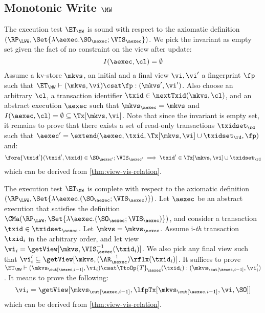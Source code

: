\subsection{Monotonic Write \( \MW \)}
\label{sec:sound-complete-mw}

The execution test $\ET_\MW$ is sound with respect to the axiomatic definition 
$(\RP_{\LWW}, \Set{\lambda \aexec. \SO_{\aexec} ; \VIS_{\aexec} })$.
We pick the invariant as empty set given the fact of no constraint on the view after update:
\[ 
    I( \aexec, \cl ) = \emptyset 
\]
Assume a kv-store $\mkvs$, an initial and a final view $\vi, \vi'$  a fingerprint $\fp$ 
such that $\ET_{\MW} \vdash (\mkvs, \vi) \csat \fp: (\mkvs',\vi')$. 
Also choose an arbitrary $\cl$, a transaction identifier $\txid \in \nextTxid(\mkvs, \cl)$, 
and an abstract execution $\aexec$ such that $\mkvs_{\aexec} = \mkvs$ and 
\( I(\aexec, \cl) =  \emptyset \subseteq \Tx[\mkvs, \vi] \).
Note that since the invariant  is empty set, it remains to prove that there exists a set of read-only transactions \( \txidset_\rd \) such that
\( \aexec' = \extend(\aexec, \txid, \Tx[\mkvs, \vi] \cup \txidset_\rd, \fp ) \) and:
\[
    \begin{array}{@{}l@{}}
        \fora{ \txid' }  (\txid' ,\txid)  \in \SO_{\aexec'} ; \VIS_{\aexec'}
        \implies \txid' \in \Tx[\mkvs, \vi] \cup \txidset_\rd
    \end{array}
\]
which can be derived from \cref{thm:view-vis-relation}.

The execution test $\ET_{\MW}$ is complete with respect to 
the axiomatic definition $(\RP_{\LWW}, \Set{\lambda \aexec.(\SO_{\aexec} ; \VIS_{\aexec})})$. 
Let $\aexec$ be an abstract execution that satisfies the definition
$\CMa(\RP_{\LWW}, \Set{\lambda \aexec.(\SO_{\aexec} ; \VIS_{\aexec})})$, 
and consider a transaction $\txid \in \txidset_{\aexec}$. 
Let \( \mkvs = \mkvs_\aexec \).
Assume i-\emph{th} transaction \( \txid_i \) in the arbitrary order,
and let view \( \vi_{i} = \getView[\mkvs, \VIS^{-1}_{\aexec}(\txid_{i})] \).
We also pick any final view such that \( \vi'_{i} \subseteq \getView[\mkvs, (\AR^{-1}_{\aexec})\rflx(\txid_{i})] \).
It suffices to prove \( \ET_\MW \vdash (\mkvs_{\cut[\aexec, i-1]}, \vi_i ) \csat  \TtoOp{T}_{\aexec}(\txid_{i}) : (\mkvs_{\cut[\aexec, i-1]}, \vi'_{i}) \).
It means to prove the following:
\[
    \vi_i = \getView[\mkvs_{\cut[\aexec, i-1]}, \lfpTx[\mkvs_{\cut[\aexec, i-1]},\vi,\SO]]
\]
which can be derived from \cref{thm:view-vis-relation}.
